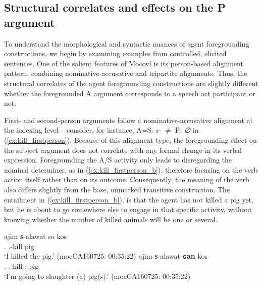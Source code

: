 \documentclass[12pt]{article}
\begin{document}
 
\subsection{Structural correlates and effects on the P argument}\label{sec:structural_feautres_p_dem}
To understand the morphological and syntactic nuances of agent foregrounding constructions, we begin by examining examples from controlled, elicited sentences. One of the salient features of Mocoví is its person-based alignment pattern, combining nominative-accusative and tripartite alignments. Thus, the structural correlates of the agent foregrounding constructions are slightly different whether the foregrounded A argument corresponds to a speech act participant or not. 

 First- and second-person arguments follow a nominative-accusative alignment at the indexing level -- consider, for instance, A=S: \textit{s-} $\neq$ P: \textit{∅} in (\ref{ex:kill_firstperson}). Because of this alignment type, the foregrounding effect on the subject argument does not correlate with any formal change in its verbal expression. Foregrounding the A/S activity only leads to  disregarding the nominal determiner, as in (\ref{ex:kill_firstperson_b}), therefore focusing on the verb action itself rather than on its outcome. Consequently, the meaning of the verb also differs slightly from the base, unmarked transitive construction. The entailment in (\ref{ex:kill_firstperson_b}), is that the agent has not killed  a pig yet, but he is about to go somewhere else to engage in that specific activity, without knowing whether the number of killed animals will be one or several.  


\begin{exe}
\ex \label{ex:kill_firstperson}
\begin{xlist}
\ex
\gll ajim \textbf{s}-alawat so kos \\
	{\First\Sg.\Pron} {\First.\II}-kill {\DetTwo} pig \\
	\trans `I killed the pig.' \hfill(mocCA160725: 00:35:22) \label{ex:kill_firstperson_a}
\ex
 \gll ajim \textbf{s}-alawat-\textbf{ɢan}  kos \\
	{\First\Sg.\Pron} {\First.\II}-kill-{\Vm:\Intr}  pig \\
	\trans `I'm going to slaughter (a) pig(s).' \label{ex:kill_firstperson_b} \hfill(mocCA160725: 00:35:22)

 \end{xlist}
\end{exe}
\end{document}

